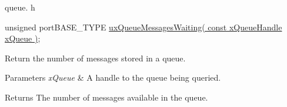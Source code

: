 queue. h 
\begin{DoxyPre}unsigned portBASE\_TYPE \hyperlink{queue_8h_aceeba9457d0f30b2a1c438e14352d7c2}{uxQueueMessagesWaiting( const xQueueHandle xQueue )};\end{DoxyPre}


Return the number of messages stored in a queue.


\begin{DoxyParams}{Parameters}
{\em x\-Queue} & A handle to the queue being queried.\\
\hline
\end{DoxyParams}
\begin{DoxyReturn}{Returns}
The number of messages available in the queue. 
\end{DoxyReturn}
